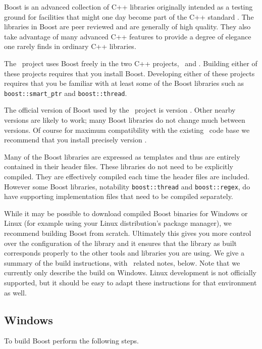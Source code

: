 Boost is an advanced collection of C++ libraries originally intended as a testing ground for facilities that might one day become part of the C++ standard \cite{boost}. The libraries in Boost are peer reviewed and are generally of high quality. They also take advantage of many advanced C++ features to provide a degree of elegance one rarely finds in ordinary C++ libraries.

The \VTank\ project uses Boost freely in the two C++ projects, \GameServer\ and \MapEditor. Building either of these projects requires that you install Boost. Developing either of these projects requires that you be familiar with at least some of the Boost libraries such as \lstinline!boost::smart_ptr! and \lstinline!boost::thread!.

The official version of Boost used by the \VTank\ project is version \BoostVersion. Other nearby versions are likely to work; many Boost libraries do not change much between versions. Of course for maximum compatibility with the existing \VTank\ code base we recommend that you install precisely version \BoostVersion.

Many of the Boost libraries are expressed as templates and thus are entirely contained in their header files. These libraries do not need to be explicitly compiled. They are effectively compiled each time the header files are included. However some Boost libraries, notability \lstinline!boost::thread! and \lstinline!boost::regex!, do have supporting implementation files that need to be compiled separately.

While it may be possible to download compiled Boost binaries for Windows or Linux (for example using your Linux distribution's package manager), we recommend building Boost from scratch. Ultimately this gives you more control over the configuration of the library and it ensures that the library as built corresponds properly to the other tools and libraries you are using. We give a summary of the build instructions, with \VTank\ related notes, below. Note that we currently only describe the build on Windows. Linux development is not officially supported, but it should be easy to adapt these instructions for that environment as well.

\subsection{Windows}

To build Boost perform the following steps.

